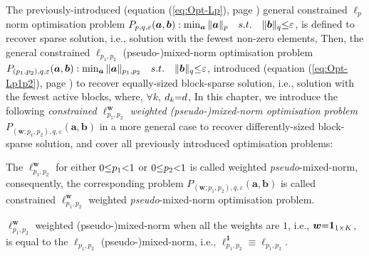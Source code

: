 The previously-introduced (equation (\ref{eq:Opt-Lp}), page \pageref{eq:Opt-Lp}) general constrained $\ell_p$ norm optimisation problem $P_{p,q,\varepsilon} (\boldsymbol{a},\boldsymbol{b}) : \min_{\boldsymbol{a}} \Vert \boldsymbol{a} \Vert_p \quad s.t. \quad \Vert \boldsymbol{b} \Vert_q {\leq} \varepsilon$, 
is defined to recover sparse solution, i.e., solution with the fewest non-zero elements, 
Then, the general constrained $\ell_{p_1,p_2}$ (pseudo-)mixed-norm optimisation problem $P_{(p_1,p_2),q,\varepsilon} (\boldsymbol{a},\boldsymbol{b}) : \min_{\boldsymbol{a}} \Vert \boldsymbol{a} \Vert_{p_1,p_2} \quad s.t. \quad \Vert \boldsymbol{b} \Vert_q {\leq} \varepsilon$, introduced (equation (\ref{eq:Opt-Lp1p2}), page \pageref{eq:Opt-Lp1p2}) to recover equally-sized block-sparse solution, i.e., solution with the fewest active blocks, where, $\forall k$, $d_k {=} d$, 
In this chapter, we introduce the following \emph{constrained $\ell_{p_1,p_2}^{\boldsymbol{w}}$ weighted (pseudo-)mixed-norm optimisation problem} $P_{(\boldsymbol{w};p_1,p_2),q,\varepsilon}(\boldsymbol{a},\boldsymbol{b})$ in a more general case to recover differently-sized block-sparse solution, and cover all previously introduced optimisation problems:


The $\ell_{p_1,p_2}^{\boldsymbol{w}}$ for either $0 {\leq} p_1 {<} 1$ or $0 {\leq} p_2 {<} 1$ is called weighted \emph{pseudo}-mixed-norm, consequently, the corresponding problem $P_{(\boldsymbol{w};p_1,p_2),q,\varepsilon}(\boldsymbol{a},\boldsymbol{b})$ is called constrained $\ell_{p_1,p_2}^{\boldsymbol{w}}$ weighted \emph{pseudo}-mixed-norm optimisation problem.

$\ell_{p_1,p_2}^{\boldsymbol{w}}$ weighted (pseudo-)mixed-norm when all the weights are $1$, i.e., $\boldsymbol{w} {=} \boldsymbol{1}_{1 {\times} K}$, is equal to the $\ell_{p_1,p_2}$ (pseudo-)mixed-norm, i.e., $\ell_{p_1,p_2}^{\boldsymbol{1}} {\equiv} \ell_{p_1,p_2}^{}$.

